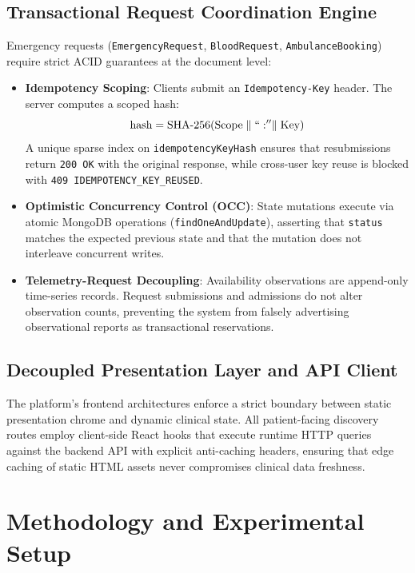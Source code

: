 \documentclass[conference]{IEEEtran}
\begin{document}
\subsection{Transactional Request Coordination Engine}
Emergency requests (\texttt{EmergencyRequest}, \texttt{BloodRequest}, \texttt{AmbulanceBooking}) require strict ACID guarantees at the document level:
\begin{itemize}
    \item \textbf{Idempotency Scoping}: Clients submit an \texttt{Idempotency-Key} header. The server computes a scoped hash:
    \begin{equation}
    \text{hash} = \text{SHA-256}(\text{Scope} \parallel ``:'' \parallel \text{Key})
    \end{equation}
    A unique sparse index on \texttt{idempotencyKeyHash} ensures that resubmissions return \texttt{200 OK} with the original response, while cross-user key reuse is blocked with \texttt{409 IDEMPOTENCY\_KEY\_REUSED}.
    \item \textbf{Optimistic Concurrency Control (OCC)}: State mutations execute via atomic MongoDB operations (\texttt{findOneAndUpdate}), asserting that \texttt{status} matches the expected previous state and that the mutation does not interleave concurrent writes.
    \item \textbf{Telemetry-Request Decoupling}: Availability observations are append-only time-series records. Request submissions and admissions do not alter observation counts, preventing the system from falsely advertising observational reports as transactional reservations.
\end{itemize}

\subsection{Decoupled Presentation Layer and API Client}
The platform's frontend architectures enforce a strict boundary between static presentation chrome and dynamic clinical state. All patient-facing discovery routes employ client-side React hooks that execute runtime HTTP queries against the backend API with explicit anti-caching headers, ensuring that edge caching of static HTML assets never compromises clinical data freshness.

\section{Methodology and Experimental Setup}
\end{document}
